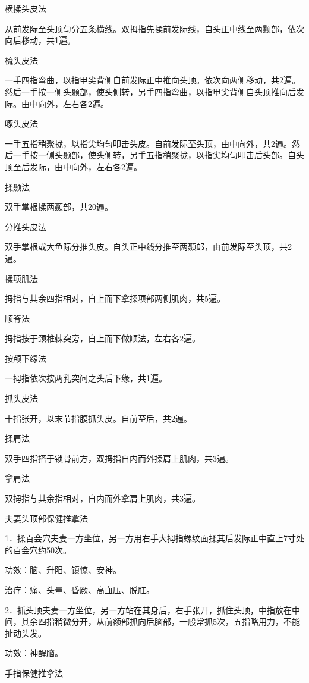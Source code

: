 \documentclass[12pt,UTF8,openany]{ctexbook}
\begin{document}
横揉头皮法

从前发际至头顶匀分五条横线。双拇指先揉前发际线，自头正中线至两颢部，依次向后移动，共1遍。

梳头皮法

一手四指弯曲，以指甲尖背侧自前发际正中推向头顶。依次向两侧移动，共2遍。然后一手按一侧头颞部，使头侧转，另手四指弯曲，以指甲尖背侧自头顶推向后发际。由中向外，左右各2遍。

啄头皮法

一手五指稍聚拢，以指尖均匀叩击头皮。自前发际至头顶，由中向外，共2遍。然后一手按一侧头颞部，使头侧转，另手五指稍聚拢，以指尖均匀叩击后头部。自头顶至后发际，由中向外，左右各2遍。

揉颞法

双手掌根揉两颞部，共20遍。

分推头皮法

双手掌根或大鱼际分推头皮。自头正中线分推至两颞郎，由前发际至头顶，共2遍。

揉项肌法

拇指与其余四指相对，自上而下拿揉项部两侧肌肉，共5遍。

顺脊法

拇指按于颈椎棘突旁，自上而下做顺法，左右各2遍。

按颅下缘法

一拇指依次按两乳突问之头后下缘，共1遍。

抓头皮法

十指张开，以末节指腹抓头皮。自前至后，共2遍。

揉肩法

双手四指搭于锁骨前方，双拇指自内而外揉肩上肌肉，共3遍。

拿肩法

双拇指与其余指相对，自内而外拿肩上肌肉，共3遍。





夫妻头顶部保健推拿法


1．揉百会穴夫妻一方坐位，另一方用右手大拇指螺纹面揉其后发际正中直上7寸处的百会穴约50次。

功效：脑、升阳、镇惊、安神。

治疗：痛、头晕、昏厥、高血压、脱肛。

2．抓头顶夫妻一方坐位，另一方站在其身后，右手张开，抓住头顶，中指放在中间，其余四指稍微分开，从前额部抓向后脑部，一般常抓5次，五指略用力，不能扯动头发。

功效：神醒脑。





手指保健推拿法
\end{document}
